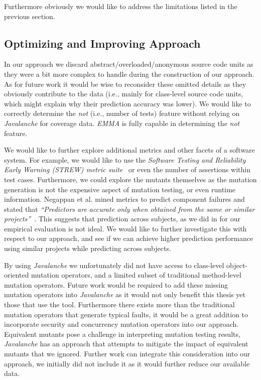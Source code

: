 Furthermore obviously we would like to address the limitations listed in the previous section.


\subsection{Optimizing and Improving Approach}
\label{subsec:conclusions_optimizing_approach}
In our approach we discard abstract/overloaded/anonymous source code units as they were a bit more complex to handle during the construction of our approach. As for future work it would be wise to reconsider these omitted details as they obviously contribute to the data (i.e., mainly for class-level source code units, which might explain why their prediction accuracy was lower). We would like to correctly determine the \emph{not} (i.e., number of tests) feature without relying on \emph{Javalanche} for coverage data. \emph{EMMA} is fully capable in determining the \emph{not} feature. 

We would like to further explore additional metrics and other facets of a software system. For example, we would like to use the \emph{Software Testing and Reliability Early Warning (STREW) metric suite}~\cite{NWO+05, NWVO05} or even the number of assertions within test cases. Furthermore, we could explore the mutants themselves as the mutation generation is not the expensive aspect of mutation testing, or even runtime information. Negappan et al. mined metrics to predict component failures and stated that \emph{``Predictors are accurate only when obtained from the same or similar projects''}~\cite{NBZ06}. This suggests that prediction across subjects, as we did in for our empirical evaluation is not ideal. We would like to further investigate this with respect to our approach, and see if we can achieve higher prediction performance using similar projects while predicting across subjects.

By using \emph{Javalanche} we unfortunately did not have access to class-level object-oriented mutation operators, and a limited subset of traditional method-level mutation operators. Future work would be required to add these missing mutation operators into \emph{Javalanche} as it would not only benefit this thesis yet those that use the tool. Furthermore there exists more than the traditional mutation operators that generate typical faults, it would be a great addition to incorporate security and concurrency mutation operators into our approach. Equivalent mutants pose a challenge in interpreting mutation testing results, \emph{Javalanche} has an approach that attempts to mitigate the impact of equivalent mutants that we ignored. Further work can integrate this consideration into our approach, we initially did not include it as it would further reduce our available data.

